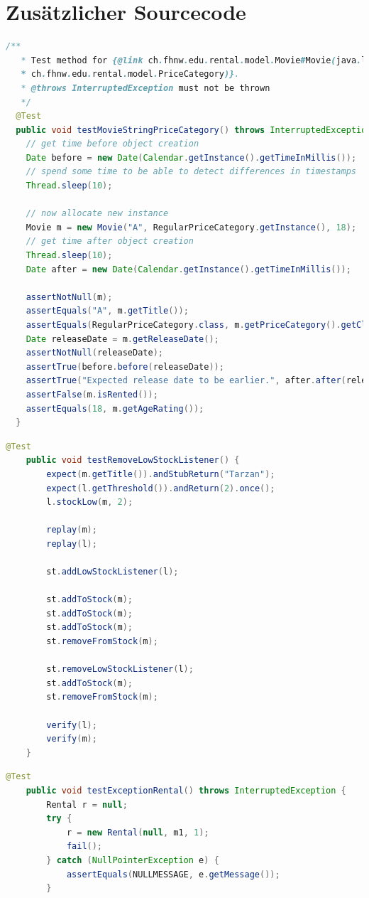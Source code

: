 \documentclass[a4paper,10pt]{article}
\begin{document}
\section{Zusätzlicher Sourcecode}
\begin{lstlisting}[language=Java,caption=JUnit-Test mit Javadoc, style=MyJavaStyle]
  /**
   * Test method for {@link ch.fhnw.edu.rental.model.Movie#Movie(java.lang.String, 
   * ch.fhnw.edu.rental.model.PriceCategory)}.
   * @throws InterruptedException must not be thrown
   */
  @Test
  public void testMovieStringPriceCategory() throws InterruptedException {
    // get time before object creation
    Date before = new Date(Calendar.getInstance().getTimeInMillis());
    // spend some time to be able to detect differences in timestamps
    Thread.sleep(10);

    // now allocate new instance
    Movie m = new Movie("A", RegularPriceCategory.getInstance(), 18);
    // get time after object creation
    Thread.sleep(10);
    Date after = new Date(Calendar.getInstance().getTimeInMillis());
    
    assertNotNull(m);
    assertEquals("A", m.getTitle());
    assertEquals(RegularPriceCategory.class, m.getPriceCategory().getClass());
    Date releaseDate = m.getReleaseDate();
    assertNotNull(releaseDate);
    assertTrue(before.before(releaseDate));
    assertTrue("Expected release date to be earlier.", after.after(releaseDate));
    assertFalse(m.isRented());
    assertEquals(18, m.getAgeRating());
  }
\end{lstlisting}
\begin{lstlisting}[language=Java,caption=Junit-Test mit Mock-Testing, style=MyJavaStyle]
    @Test
    public void testRemoveLowStockListener() {
        expect(m.getTitle()).andStubReturn("Tarzan");
        expect(l.getThreshold()).andReturn(2).once();
        l.stockLow(m, 2);
        
        replay(m);
        replay(l);
        
        st.addLowStockListener(l);
        
        st.addToStock(m);
        st.addToStock(m);
        st.addToStock(m);
        st.removeFromStock(m);
        
        st.removeLowStockListener(l);
        st.addToStock(m);
        st.removeFromStock(m);
        
        verify(l);
        verify(m);
    }
\end{lstlisting}

\begin{lstlisting}[language=Java,caption=Junit-Test mit korrekter Verwendung von fail(), style=MyJavaStyle]
    @Test
    public void testExceptionRental() throws InterruptedException {
        Rental r = null;
        try {
            r = new Rental(null, m1, 1);
            fail();
        } catch (NullPointerException e) {
            assertEquals(NULLMESSAGE, e.getMessage());
        }
\end{lstlisting}
\end{document}
